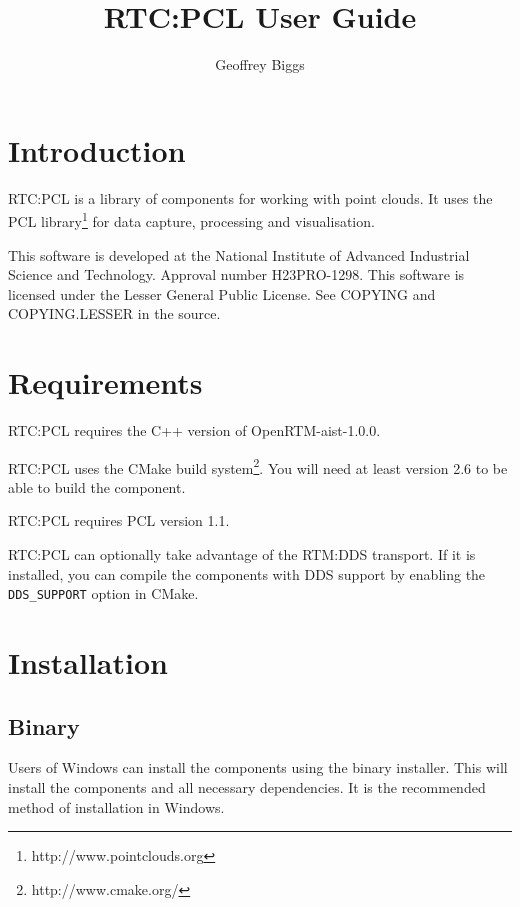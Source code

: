 \documentclass[a4paper,10pt]{article}
\title{RTC:PCL User Guide}
\author{Geoffrey Biggs}
\begin{document}
\maketitle

\setcounter{tocdepth}{1}
\tableofcontents

\newpage

\section{Introduction}
\label{sec:intro}

RTC:PCL is a library of components for working with point clouds. It uses the
PCL library\footnote{http://www.pointclouds.org} for data capture, processing
and visualisation.

This software is developed at the National Institute of Advanced Industrial
Science and Technology. Approval number H23PRO-1298. This software is licensed
under the Lesser General Public License. See COPYING and COPYING.LESSER in the
source.

\section{Requirements}
\label{sec:requirements}

RTC:PCL requires the C++ version of OpenRTM-aist-1.0.0.

RTC:PCL uses the CMake build system\footnote{http://www.cmake.org/}. You will
need at least version 2.6 to be able to build the component.

RTC:PCL requires PCL version 1.1.

RTC:PCL can optionally take advantage of the RTM:DDS transport. If it is
installed, you can compile the components with DDS support by enabling the
\verb|DDS_SUPPORT| option in CMake.

\section{Installation}
\label{sec:installation}

\subsection{Binary}

Users of Windows can install the components using the binary installer. This
will install the components and all necessary dependencies. It is the
recommended method of installation in Windows.
\end{document}
